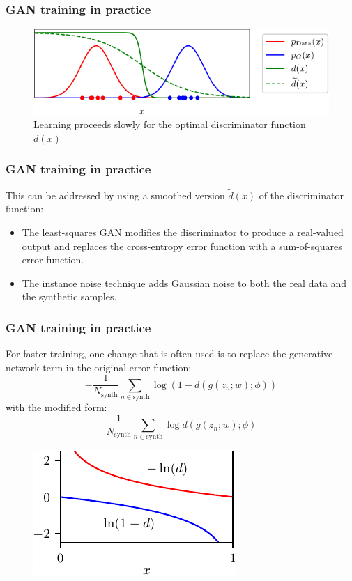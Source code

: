 \documentclass{beamer}
\begin{document}
\begin{frame}
    \frametitle{GAN training in practice}
    \begin{figure}
        \caption{Learning proceeds slowly for the optimal discriminator function $d(x)$}
        \includegraphics{Figure_2.pdf}
    \end{figure}
\end{frame}

\begin{frame}
    \frametitle{GAN training in practice}
    This can be addressed by using a smoothed version $\tilde{d}(x)$ of the discriminator function:
    \begin{itemize}
        \item The least-squares GAN modifies the discriminator to produce a real-valued output and replaces the cross-entropy error function with a sum-of-squares error function.
        \item The instance noise technique adds Gaussian noise to both the real data and the synthetic samples.
    \end{itemize}
\end{frame}

\begin{frame}
    \frametitle{GAN training in practice}
    For faster training, one change that is often used is to replace the generative network term in the original error function:
    \begin{equation*}
        -\frac{1}{N_{\textrm{synth}}}\sum_{n\in\textrm{synth}}\log(1-d(g(z_{n};w);\phi))
    \end{equation*}
    with the modified form:
    \begin{equation*}
        \frac{1}{N_{\textrm{synth}}}\sum_{n\in\textrm{synth}}\log{}d(g(z_{n};w);\phi)
    \end{equation*}
    \begin{figure}
        \includegraphics{Figure_3.pdf}
    \end{figure}
\end{frame}
\end{document}
